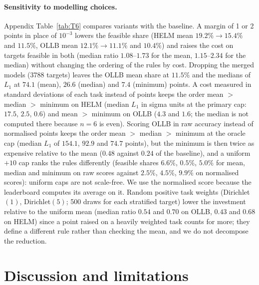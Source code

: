 \documentclass{article}
\begin{document}
\paragraph{Sensitivity to modelling choices.}
Appendix Table~\ref{tab:T6} compares variants with the baseline. A margin of 1 or 2 points in place of $10^{-3}$ lowers the feasible share (HELM mean $19.2\%\to15.4\%$ and $11.5\%$, OLLB mean $12.1\%\to11.1\%$ and $10.4\%$) and raises the cost on targets feasible in both (median ratio $1.08$--$1.73$ for the mean, $1.15$--$2.34$ for the median) without changing the ordering of the rules by cost. Dropping the merged models (3788 targets) leaves the OLLB mean share at $11.5\%$ and the medians of $L_1$ at $74.1$ (mean), $26.6$ (median) and $7.4$ (minimum) points. A cost measured in standard deviations of each task instead of points keeps the order mean $>$ median $>$ minimum on HELM (median $L_1$ in sigma units at the primary cap: $17.5$, $2.5$, $0.6$) and mean $>$ minimum on OLLB ($4.3$ and $1.6$; the median is not computed there because $n=6$ is even). Scoring OLLB in raw accuracy instead of normalised points keeps the order mean $>$ median $>$ minimum at the oracle cap (median $L_1$ of $154.1$, $92.9$ and $74.7$ points), but the minimum is then twice as expensive relative to the mean ($0.48$ against $0.24$ of the baseline), and a uniform $+10$ cap ranks the rules differently (feasible shares $6.6\%$, $0.5\%$, $5.0\%$ for mean, median and minimum on raw scores against $2.5\%$, $4.5\%$, $9.9\%$ on normalised scores): uniform caps are not scale-free. We use the normalised score because the leaderboard computes its average on it. Random positive task weights (Dirichlet$(1)$, Dirichlet$(5)$; 500 draws for each stratified target) lower the investment relative to the uniform mean (median ratio $0.54$ and $0.70$ on OLLB, $0.43$ and $0.68$ on HELM) since a point raised on a heavily weighted task counts for more; they define a different rule rather than checking the mean, and we do not decompose the reduction.

\section{Discussion and limitations}
\label{sec:disc}
\end{document}

